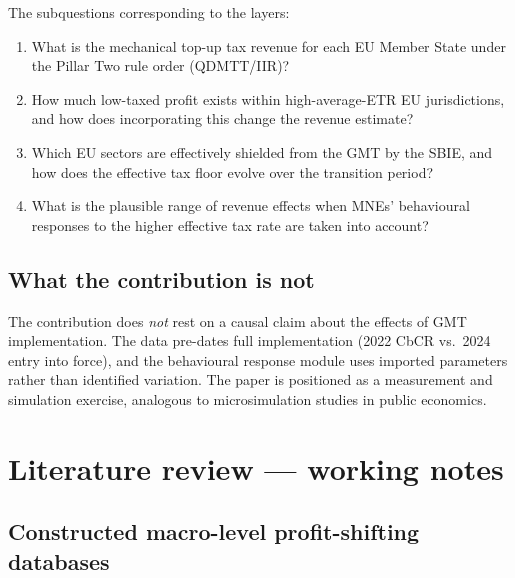 \documentclass[11pt,a4paper]{article}
\begin{document}
The subquestions corresponding to the layers:
\begin{enumerate}
\item What is the mechanical top-up tax revenue for each EU Member State under the Pillar Two rule order (QDMTT/IIR)?
\item How much low-taxed profit exists within high-average-ETR EU jurisdictions, and how does incorporating this change the revenue estimate?
\item Which EU sectors are effectively shielded from the GMT by the SBIE, and how does the effective tax floor evolve over the transition period?
\item What is the plausible range of revenue effects when MNEs' behavioural responses to the higher effective tax rate are taken into account?
\end{enumerate}

\subsection{What the contribution is not}

The contribution does \emph{not} rest on a causal claim about the effects of GMT implementation. The data pre-dates full implementation (2022 CbCR vs.\ 2024 entry into force), and the behavioural response module uses imported parameters rather than identified variation. The paper is positioned as a measurement and simulation exercise, analogous to microsimulation studies in public economics.

\section{Literature review --- working notes}\label{w:litreview}

\subsection{Constructed macro-level profit-shifting databases}
\end{document}
